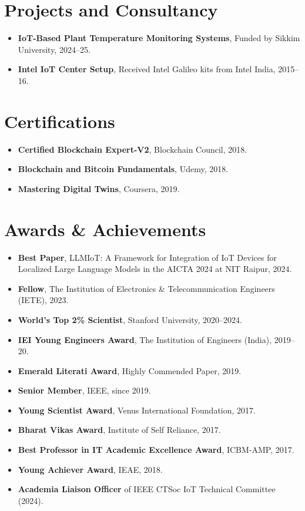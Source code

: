 \documentclass[10pt,a4paper]{article}
\begin{document}
	
	\section*{Projects and Consultancy}
	
	\begin{itemize}[leftmargin=0.15in]
		\item \textbf{IoT-Based Plant Temperature Monitoring Systems}, Funded by Sikkim University, 2024--25.
		\item \textbf{Intel IoT Center Setup}, Received Intel Galileo kits from Intel India, 2015--16.
		
	\end{itemize}
	
	\section*{Certifications}
	
	\begin{itemize}[leftmargin=0.15in]
		\item \textbf{Certified Blockchain Expert-V2}, Blockchain Council, 2018.
		\item \textbf{Blockchain and Bitcoin Fundamentals}, Udemy, 2018.
		\item \textbf{Mastering Digital Twins}, Coursera, 2019.
	\end{itemize}
	
	\section*{Awards \& Achievements}
	
	\begin{itemize}[leftmargin=0.15in]
		\item \textbf{Best Paper}, LLMIoT: A Framework for Integration of IoT Devices for Localized Large Language
		Models in the AICTA 2024 at NIT Raipur, 2024.
		\item \textbf{Fellow}, The Institution of Electronics \& Telecommunication Engineers (IETE), 2023.
		\item \textbf{World's Top 2\% Scientist}, Stanford University, 2020--2024.
		\item \textbf{IEI Young Engineers Award}, The Institution of Engineers (India), 2019--20.
		\item \textbf{Emerald Literati Award}, Highly Commended Paper, 2019.
		\item \textbf{Senior Member}, IEEE, since 2019.
		\item \textbf{Young Scientist Award}, Venus International Foundation, 2017.
		\item \textbf{Bharat Vikas Award}, Institute of Self Reliance, 2017.
		\item \textbf{Best Professor in IT Academic Excellence Award}, ICBM-AMP, 2017.
		\item \textbf{Young Achiever Award}, IEAE, 2018.
		\item \textbf{Academia Liaison Officer} of IEEE CTSoc IoT Technical Committee (2024).
		
		
	\end{itemize}
	
\end{document}
